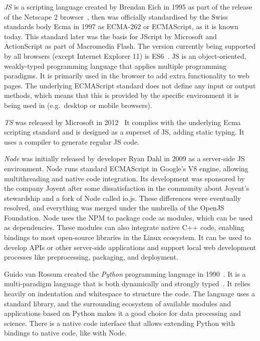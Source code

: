 \emph{\ac{JS}} is a scripting language created by Brendan Eich in 1995 as part of the release of the Netscape 2 browser~\parencite{javascriptRelease}, then was officially standardised by the Swiss standards body Ecma in 1997 as ECMA-262 or ECMAScript, as it is known today.
This standard later was the basis for JScript by Microsoft and ActionScript as part of Macromedia Flash.
The version currently being supported by all browsers (except Internet Explorer 11) is \ac{ES6}~\parencite{javascriptHistory}. \ac{JS} is an object-oriented, weakly-typed programming language that applies multiple programming paradigms.
It is primarily used in the browser to add extra functionality to web pages.
The underlying ECMAScript standard does not define any input or output methods, which means that this is provided by the specific environment it is being used in (e.g.\ desktop or mobile browsers).

\emph{\ac{TS}} was released by Microsoft in 2012~ It complies with the underlying Ecma scripting standard and is designed as a superset of \ac{JS}, adding static typing.
It uses a compiler to generate regular \ac{JS} code.

\emph{Node} was initially released by developer Ryan Dahl in 2009 as a server-side \ac{JS} environment.
Node runs standard ECMAScript in Google's V8 engine, allowing multithreading and native code integration.
Its development was sponsored by the company Joyent after some dissatisfaction in the community about Joyent's stewardship and a fork of Node called io.js.
These differences were eventually resolved, and everything was merged under the umbrella of the OpenJS Foundation.
Node uses the \ac{NPM} to package code as modules, which can be used as dependencies.
These modules can also integrate native C++ code, enabling bindings to most open-source libraries in the Linux ecosystem.
It can be used to develop \ac{API}s or other server-side applications and support local web development processes like preprocessing, packaging, and deployment.

Guido van Rossum created the \emph{Python} programming language in 1990~\parencite{pythonHistory}.
It is a multi-paradigm language that is both dynamically and strongly typed~\parencite{pythonTyping}.
It relies heavily on indentation and whitespace to structure the code.
The language uses a standard library, and the surrounding ecosystem of available modules and applications based on Python makes it a good choice for data processing and science.
There is a native code interface that allows extending Python with bindings to native code, like with Node.

